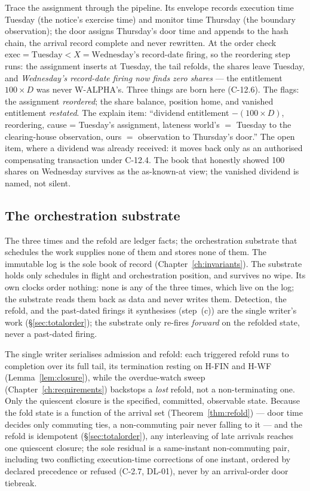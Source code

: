 \documentclass[11pt,a4paper]{article}
\begin{document}
\noindent Trace the assignment through the pipeline. Its envelope records execution time
Tuesday (the notice's exercise time) and monitor time Thursday (the boundary observation); the
door assigns Thursday's door time and appends to the hash chain, the arrival record complete and
never rewritten. At the order check $\mathrm{exec}=\text{Tuesday}<X=\text{Wednesday's
record-date firing}$, so the reordering step runs: the assignment inserts at Tuesday, the tail
refolds, the shares leave Tuesday, and \emph{Wednesday's record-date firing now finds zero
shares} --- the entitlement $100\times D$ was never W-ALPHA's. Three things are born here (C-12.6). The
flags: the assignment \emph{reordered}; the share balance, position home, and vanished
entitlement \emph{restated}. The explain item: ``dividend entitlement $-(100\times D)$,
reordering, cause = Tuesday's assignment, lateness world's $=$ Tuesday to the clearing-house
observation, ours $=$ observation to Thursday's door.'' The open item, where a dividend was
already received: it moves back only as an authorised compensating transaction under C-12.4. The
book that honestly showed 100 shares on Wednesday survives as the as-known-at view; the vanished
dividend is named, not silent.

\subsection{The orchestration substrate}\label{sec:substrate}

The three times and the refold are ledger facts; the orchestration substrate that schedules the
work supplies none of them and stores none of them. The immutable log is the sole book of record
(Chapter~\ref{ch:invariants}). The substrate holds only schedules in flight and orchestration
position, and survives no wipe. Its own clocks order nothing: none is any of the three times,
which live on the log; the substrate reads them back as data and never writes them. Detection, the
refold, and the past-dated firings it synthesises (step~(c)) are the single writer's work
(\S\ref{sec:totalorder}); the substrate only re-fires \emph{forward} on the refolded state, never
a past-dated firing.

The single writer serialises admission and refold: each triggered refold runs to completion over
its full tail, its termination resting on H-FIN and H-WF (Lemma~\ref{lem:closure}), while the
overdue-watch sweep (Chapter~\ref{ch:requirements}) backstops a \emph{lost} refold, not a
non-terminating one. Only the quiescent closure is the specified, committed, observable state.
Because the fold state is a function of the arrival set (Theorem~\ref{thm:refold}) --- door time
decides only commuting ties, a non-commuting pair never falling to it --- and the refold is
idempotent (\S\ref{sec:totalorder}), any interleaving of late arrivals reaches one quiescent
closure; the sole residual is a same-instant non-commuting pair, including two conflicting
execution-time corrections of one instant, ordered by declared precedence or refused (C-2.7,
DL-01), never by an arrival-order door tiebreak.
\end{document}
